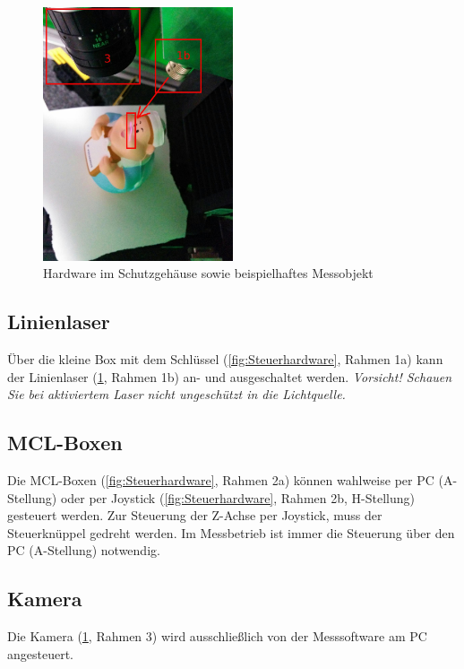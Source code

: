 \documentclass[a4paper,10pt]{scrartcl}
\begin{document}
\begin{figure}[h]
  \centering
  \includegraphics[width=0.5\textwidth]{include/IMG_20160412_135830.jpg}
  \caption{Hardware im Schutzgehäuse sowie beispielhaftes Messobjekt}
  \label{fig:Hardware}
\end{figure}

\newpage
\subsection{Linienlaser}

Über die kleine Box mit dem Schlüssel (\cref{fig:Steuerhardware}, Rahmen 1a) kann der
Linienlaser (\cref{fig:Hardware}, Rahmen 1b) an- und ausgeschaltet werden.
\textit{Vorsicht! Schauen Sie bei aktiviertem Laser nicht ungeschützt in die Lichtquelle.}

\subsection{MCL-Boxen}

Die MCL-Boxen (\cref{fig:Steuerhardware}, Rahmen 2a) können wahlweise per PC (A-Stellung) oder
per Joystick (\cref{fig:Steuerhardware}, Rahmen 2b, H-Stellung) gesteuert
werden. Zur Steuerung der Z-Achse per Joystick, muss der Steuerknüppel gedreht werden. Im Messbetrieb
ist immer die Steuerung über den PC (A-Stellung) notwendig.

\subsection{Kamera}

Die Kamera (\cref{fig:Hardware}, Rahmen 3) wird ausschließlich von der Messsoftware am PC angesteuert.
\end{document}

